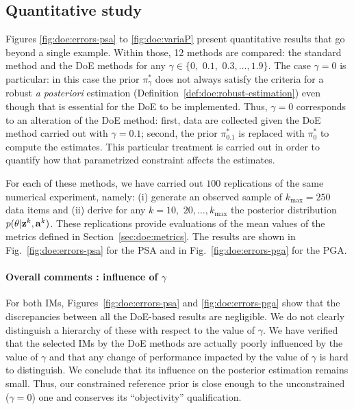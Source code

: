     \subsection{Quantitative study}



Figures \ref{fig:doe:errors-psa} to \ref{fig:doe:variaP} present 
quantitative results that go beyond a single example.
Within those, 12 methods are compared:
    the standard method and the DoE methods for any $\gamma\in\{0,$ $0.1,$ $0.3,\dots,1.9\}$.
The case $\gamma=0$ is particular: in this case the prior $\pi^\ast_\gamma$ does not always satisfy the criteria for a robust \emph{a posteriori} estimation (Definition~\ref{def:doe:robust-estimation}) even though that is essential for the DoE to be implemented. Thus, $\gamma=0$ corresponds to an alteration of the DoE method:
    first, data are collected given the DoE method carried out with $\gamma=0.1$; second, the prior $\pi^\ast_{0.1}$ is replaced with $\pi^\ast_0$ to compute the estimates.
This particular treatment is carried out in order to quantify how that parametrized constraint affects the estimates.

{For each of these methods, we have carried out $100$ replications of the same numerical experiment, namely: (i) generate an observed sample of $k_{\max}=250$ data items and (ii) derive for any $k=10,$ $20,\dots,k_{\max}$ the posterior distribution $p(\theta|\mathbf{z}^k,\mathbf{a}^k)$.
These replications provide evaluations of the mean values of the metrics defined in Section~\ref{sec:doe:metrics}. The results are shown in Fig.~\ref{fig:doe:errors-psa} for the PSA and in Fig.~\ref{fig:doe:errors-pga} for the PGA.}


\paragraph{{Overall comments : influence of $\gamma$}}

{For both IMs, Figures~\ref{fig:doe:errors-psa} and \ref{fig:doe:errors-pga} show that the discrepancies between all the DoE-based results are negligible. We do not clearly distinguish a hierarchy of these with respect to the value of $\gamma$.}
We have verified that the selected IMs by the DoE methods are actually poorly influenced by the value of $\gamma$ and that any change of performance impacted by the value of $\gamma$ is hard to distinguish. We conclude that its influence on the posterior estimation remains small. Thus, our constrained reference prior is close enough to the unconstrained ($\gamma = 0$) one and conserves its ``objectivity'' qualification.

